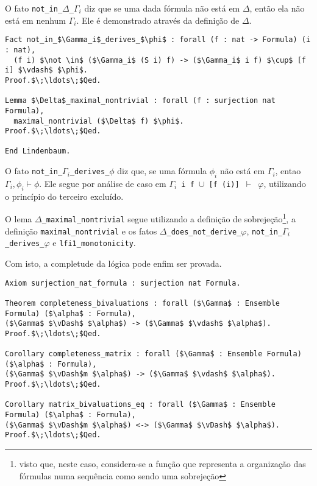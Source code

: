         O fato \texttt{not\_in\_$\Delta$\_$\Gamma_i$} diz que se uma dada fórmula não está em $\Delta$, então ela não está em nenhum $\Gamma_i$. Ele é demonstrado através da definição de $\Delta$.
        
        \begin{lstlisting}[name=Completeness, frame=single, language=coq]
Fact not_in_$\Gamma_i$_derives_$\phi$ : forall (f : nat -> Formula) (i : nat),
  (f i) $\not \in$ ($\Gamma_i$ (S i) f) -> ($\Gamma_i$ i f) $\cup$ [f i] $\vdash$ $\phi$.
Proof.$\;\ldots\;$Qed.

Lemma $\Delta$_maximal_nontrivial : forall (f : surjection nat Formula),
  maximal_nontrivial ($\Delta$ f) $\phi$.
Proof.$\;\ldots\;$Qed.

End Lindenbaum.
        \end{lstlisting}

        O fato \texttt{not\_in\_$\Gamma_i$\_derives\_$\phi$} diz que, se uma fórmula $\phi_i$ não está em $\Gamma_i$, entao $\Gamma_i, \phi_i \vdash \phi$. Ele segue por análise de caso em \texttt{$\Gamma_i$\ i\ f $\cup$ [f (i)] $\vdash$ $\varphi$}, utilizando o princípio do terceiro excluído.
        
        O lema \texttt{$\Delta$\_maximal\_nontrivial} segue utilizando a definição de sobrejeção\footnote{visto que, neste caso, considera-se a função que representa a organização das fórmulas numa sequência como sendo uma sobrejeção}, a definição \texttt{maximal\_nontrivial} e os fatos \texttt{$\Delta$\_does\_not\_derive\_$\varphi$}, \texttt{not\_in\_$\Gamma_i$\_derives\_$\varphi$} e \texttt{lfi1\_monotonicity}.

        Com isto, a completude da lógica \lfium{} pode enfim ser provada.

        \begin{lstlisting}[name=Completeness, frame=single, language=coq]
Axiom surjection_nat_formula : surjection nat Formula.

Theorem completeness_bivaluations : forall ($\Gamma$ : Ensemble Formula) ($\alpha$ : Formula), 
($\Gamma$ $\vDash$ $\alpha$) -> ($\Gamma$ $\vdash$ $\alpha$).
Proof.$\;\ldots\;$Qed.
  
Corollary completeness_matrix : forall ($\Gamma$ : Ensemble Formula) ($\alpha$ : Formula), 
($\Gamma$ $\vDash$m $\alpha$) -> ($\Gamma$ $\vdash$ $\alpha$).
Proof.$\;\ldots\;$Qed.

Corollary matrix_bivaluations_eq : forall ($\Gamma$ : Ensemble Formula) ($\alpha$ : Formula),
($\Gamma$ $\vDash$m $\alpha$) <-> ($\Gamma$ $\vDash$ $\alpha$).
Proof.$\;\ldots\;$Qed.
        \end{lstlisting}

